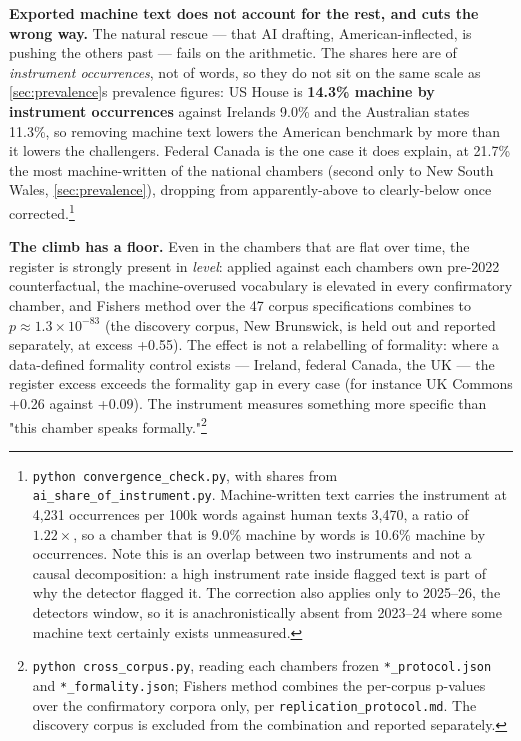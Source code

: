 \textbf{Exported machine text does not account for the rest, and cuts the wrong
way.} The natural rescue --- that AI drafting, American-inflected, is pushing
the others past --- fails on the arithmetic. The shares here are of \emph{instrument
occurrences}, not of words, so they do not sit on the same scale as \cref{sec:prevalence}\textquotesingle s
prevalence figures: US House is \textbf{14.3\% machine by instrument occurrences}
against Ireland\textquotesingle s 9.0\% and the Australian states\textquotesingle{} 11.3\%, so removing machine
text lowers the American benchmark by more than it lowers the challengers.
Federal Canada is the one case it does explain, at 21.7\% the most
machine-written of the national chambers (second only to New South Wales,
\cref{sec:prevalence}), dropping from apparently-above to clearly-below once corrected.\footnote{\texttt{python\ convergence\_\allowbreak{}check.\allowbreak{}py}, with shares from
  \texttt{ai\_\allowbreak{}share\_\allowbreak{}of\_\allowbreak{}instrument.\allowbreak{}py}. Machine-written text carries the instrument at
  4,231 occurrences per 100k words against human text\textquotesingle s 3,470, a ratio of
  \(1.22\times\), so a chamber that is 9.0\% machine by words is 10.6\% machine by
  occurrences. Note this is an overlap between two instruments and not a
  causal decomposition: a high instrument rate inside flagged text is part of
  why the detector flagged it. The correction also applies only to 2025--26,
  the detector\textquotesingle s window, so it is anachronistically absent from 2023--24 where
  some machine text certainly exists unmeasured.}

\textbf{The climb has a floor.} Even in the chambers that are flat over time, the register is strongly present in \emph{level}: applied against each chamber\textquotesingle s own pre-2022 counterfactual, the machine-overused vocabulary is elevated in every confirmatory chamber, and Fisher\textquotesingle s method\cite{fisher1925} over the 47 corpus specifications combines to \textbf{\(p \approx 1.3\times 10^{-83}\)} (the discovery corpus, New Brunswick, is held out and reported separately, at excess +0.55). The effect is not a relabelling of formality: where a data-defined formality control exists --- Ireland, federal Canada, the UK --- the register excess exceeds the formality gap in every case (for instance UK Commons +0.26 against +0.09). The instrument measures something more specific than "this chamber speaks formally."\footnote{\texttt{python\ cross\_corpus.py}, reading each chamber\textquotesingle s frozen \texttt{*\_protocol.json} and \texttt{*\_formality.json}; Fisher\textquotesingle s method combines the per-corpus p-values over the confirmatory corpora only, per \texttt{replication\_protocol.md}. The discovery corpus is excluded from the combination and reported separately.}

